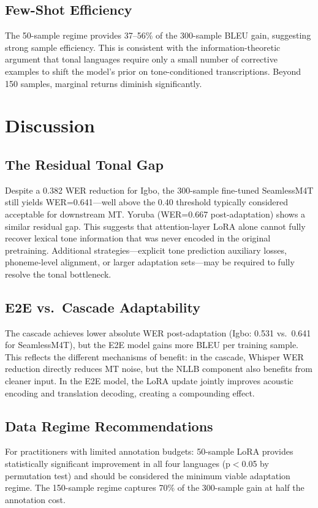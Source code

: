\documentclass[11pt,a4paper]{article}
\begin{document}
\subsection{Few-Shot Efficiency}

The 50-sample regime provides 37–56\% of the 300-sample BLEU gain, suggesting strong sample efficiency. This is consistent with the information-theoretic argument that tonal languages require only a small number of corrective examples to shift the model's prior on tone-conditioned transcriptions. Beyond 150 samples, marginal returns diminish significantly.

\section{Discussion}
\label{sec:discussion}

\subsection{The Residual Tonal Gap}
Despite a 0.382 WER reduction for Igbo, the 300-sample fine-tuned SeamlessM4T still yields WER=0.641—well above the 0.40 threshold typically considered acceptable for downstream MT. Yoruba (WER=0.667 post-adaptation) shows a similar residual gap. This suggests that attention-layer LoRA alone cannot fully recover lexical tone information that was never encoded in the original pretraining. Additional strategies—explicit tone prediction auxiliary losses, phoneme-level alignment, or larger adaptation sets—may be required to fully resolve the tonal bottleneck.

\subsection{E2E vs.\ Cascade Adaptability}
The cascade achieves lower absolute WER post-adaptation (Igbo: 0.531 vs.\ 0.641 for SeamlessM4T), but the E2E model gains more BLEU per training sample. This reflects the different mechanisms of benefit: in the cascade, Whisper WER reduction directly reduces MT noise, but the NLLB component also benefits from cleaner input. In the E2E model, the LoRA update jointly improves acoustic encoding and translation decoding, creating a compounding effect.

\subsection{Data Regime Recommendations}
For practitioners with limited annotation budgets: 50-sample LoRA provides statistically significant improvement in all four languages (p$<$0.05 by permutation test) and should be considered the minimum viable adaptation regime. The 150-sample regime captures 70\% of the 300-sample gain at half the annotation cost.
\end{document}
